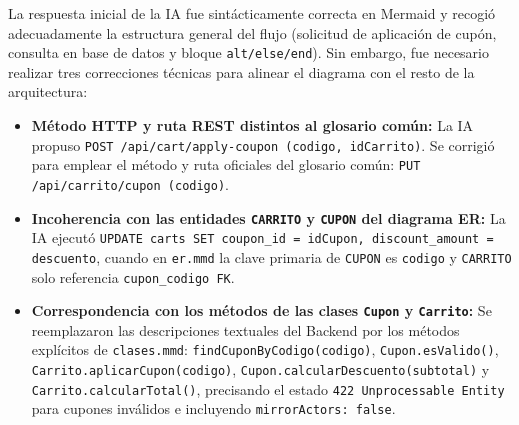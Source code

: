 La respuesta inicial de la IA fue sintácticamente correcta en Mermaid y recogió adecuadamente la estructura general del flujo (solicitud de aplicación de cupón, consulta en base de datos y bloque \texttt{alt/else/end}). Sin embargo, fue necesario realizar tres correcciones técnicas para alinear el diagrama con el resto de la arquitectura:
\begin{itemize}[leftmargin=*,nosep]
\item \textbf{Método HTTP y ruta REST distintos al glosario común:} La IA propuso \texttt{POST /api/cart/apply-coupon (codigo, idCarrito)}. Se corrigió para emplear el método y ruta oficiales del glosario común: \texttt{PUT /api/carrito/cupon (codigo)}.
\item \textbf{Incoherencia con las entidades \texttt{CARRITO} y \texttt{CUPON} del diagrama ER:} La IA ejecutó \texttt{UPDATE carts SET coupon\_id = idCupon, discount\_amount = descuento}, cuando en \texttt{er.mmd} la clave primaria de \texttt{CUPON} es \texttt{codigo} y \texttt{CARRITO} solo referencia \texttt{cupon\_codigo FK}.
\item \textbf{Correspondencia con los métodos de las clases \texttt{Cupon} y \texttt{Carrito}:} Se reemplazaron las descripciones textuales del Backend por los métodos explícitos de \texttt{clases.mmd}: \texttt{findCuponByCodigo(codigo)}, \texttt{Cupon.esValido()}, \texttt{Carrito.aplicarCupon(codigo)}, \texttt{Cupon.calcularDescuento(subtotal)} y \texttt{Carrito.calcularTotal()}, precisando el estado \texttt{422 Unprocessable Entity} para cupones inválidos e incluyendo \texttt{mirrorActors: false}.
\end{itemize}
